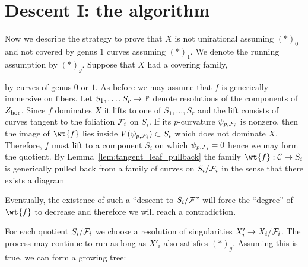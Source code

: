 \documentclass[main.tex]{subfiles}
\begin{document}
\section{Descent I: the algorithm}

Now we describe the strategy to prove that $X$ is not unirational assuming $(\ast)_0$ and not covered by genus $1$ curves assuming $(\ast)_1$. We denote the running assumption by $(\ast)_g$. Suppose that $X$ had a covering family,
\begin{center}
\end{center}
by curves of genus $0$ or $1$. As before we may assume that $f$ is generically immersive on fibers. Let $S_1, \dots, S_r \to \P$ denote resolutions of the components of $\Zhor$. Since $f$ dominates $X$ it lifts to one of $S_1, \dots, S_r$ and the lift consists of curves tangent to the foliation $\F_i$ on $S_i$. If its $p$-curvature $\psi_{p,\F_i}$ is nonzero, then the image of $\wt{f}$ lies inside $V(\psi_{p, \F_i}) \subset S_i$ which does not dominate $X$. Therefore, $f$ must lift to a component $S_i$ on which $\psi_{p, \F_i} = 0$ hence we may form the quotient. By Lemma~\ref{lem:tangent_leaf_pullback} the family $\wt{f} : \cC \to S_i$ is generically pulled back from a family of curves on $S_i / \F_i$ in the sense that there exists a diagram
\begin{center}
\end{center}
Eventually, the existence of such a ``descent to $S_i/\F$'' will force the ``degree'' of $\wt{f}$ to decrease and therefore we will reach a contradiction.
\par 
For each quotient $S_i / \F_i$ we choose a resolution of singularities $X'_i \to X_i / \F_i$. The process may continue to run as long as $X'_i$ also satisfies $(\ast)_g$. Assuming this is true, we can form a growing tree:
\begin{center}
\end{center}
\end{document}

